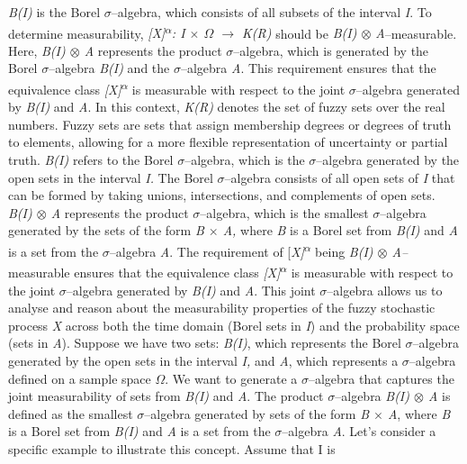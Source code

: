 \documentclass[12pt,a4paper]{report}
\numberwithin{equation}{section}
\begin{document}
\emph{B(I)} is the Borel $\sigma$--algebra, which consists of all subsets of the
interval \emph{I}. To determine measurability,
\emph{{[}X{]}\textsuperscript{$\alpha$}: I $\times$ $\Omega$ $\rightarrow$ K(R)} should be \emph{B(I) $\otimes$
A}--measurable. Here, \emph{B(I) $\otimes$ A} represents the product $\sigma$--algebra,
which is generated by the Borel $\sigma$--algebra \emph{B(I)} and the $\sigma$--algebra
\emph{A}. This requirement ensures that the equivalence class
\emph{{[}X{]}\textsuperscript{$\alpha$}} is measurable with respect to the
joint $\sigma$--algebra generated by \emph{B(I)} and \emph{A}. In this context,
\emph{K(R)} denotes the set of fuzzy sets over the real numbers. Fuzzy
sets are sets that assign membership degrees or degrees of truth to
elements, allowing for a more flexible representation of uncertainty or
partial truth. \emph{B(I)} refers to the Borel $\sigma$--algebra, which is the
$\sigma$--algebra generated by the open sets in the interval \emph{I.} The Borel
$\sigma$--algebra consists of all open sets of \emph{I} that can
be formed by taking unions, intersections, and complements of open sets.
\emph{B(I) $\otimes$ A} represents the product $\sigma$--algebra, which is the smallest
$\sigma$--algebra generated by the sets of the form \emph{B $\times$ A,} where \emph{B}
is a Borel set from \emph{B(I)} and \emph{A} is a set from the $\sigma$--algebra
\emph{A}. The requirement of {[}\emph{X{]}\textsuperscript{$\alpha$}} being
\emph{B(I) $\otimes$ A--}measurable ensures that the equivalence class
\emph{{[}X{]}\textsuperscript{$\alpha$}} is measurable with respect to the
joint $\sigma$--algebra generated by \emph{B(I)} and \emph{A}. This joint
$\sigma$--algebra allows us to analyse and reason about the measurability
properties of the fuzzy stochastic process \emph{X} across both the time
domain (Borel sets in \emph{I}) and the probability space (sets in
\emph{A}). Suppose we have two sets: \emph{B(I)}, which represents the
Borel $\sigma$--algebra generated by the open sets in the interval \emph{I,} and
\emph{A}, which represents a $\sigma$--algebra defined on a sample space
\emph{$\Omega$}. We want to generate a $\sigma$--algebra that captures the joint
measurability of sets from \emph{B(I)} and \emph{A}. The product
$\sigma$--algebra \emph{B(I) $\otimes$ A} is defined as the smallest $\sigma$--algebra generated
by sets of the form \emph{B $\times$ A}, where \emph{B} is a Borel set from
\emph{B(I)} and \emph{A} is a set from the $\sigma$--algebra \emph{A}. Let's
consider a specific example to illustrate this concept. Assume that I is
\end{document}

